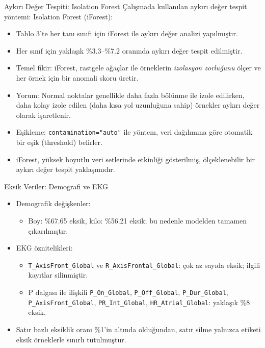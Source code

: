 \documentclass[aspectratio=169]{beamer}
\def\textbf#1{#1}%
\begin{document}
\begin{frame}{Aykırı Değer Tespiti: Isolation Forest}
	Çalışmada kullanılan aykırı değer tespit yöntemi: \textbf{Isolation Forest (iForest)}:
	\begin{itemize}
		\item \textbf{Tablo 3}’te her tanı sınıfı için iForest ile aykırı değer analizi yapılmıştır.
		\item Her sınıf için yaklaşık \textbf{\%3.3--\%7.2} oranında aykırı değer tespit edilmiştir.
		\item \textbf{Temel fikir:} iForest, rastgele ağaçlar ile örneklerin \emph{izolasyon zorluğunu} ölçer ve her örnek için bir \textbf{anomali skoru} üretir.
		\item \textbf{Yorum:} Normal noktalar genellikle daha fazla bölünme ile izole edilirken, \textbf{daha kolay izole edilen} (daha kısa yol uzunluğuna sahip) örnekler aykırı değer olarak işaretlenir.
		\item \textbf{Eşikleme:} \texttt{contamination="auto"} ile yöntem, veri dağılımına göre \textbf{otomatik} bir eşik (threshold) belirler.
		\item iForest, \textbf{yüksek boyutlu} veri setlerinde etkinliği gösterilmiş, ölçeklenebilir bir aykırı değer tespit yaklaşımıdır.
	\end{itemize}
\end{frame}

\begin{frame}{Eksik Veriler: Demografi ve EKG}
	\begin{itemize}
		\item Demografik değişkenler:
			\begin{itemize}
				\item Boy: \%67.65 eksik, kilo: \%56.21 eksik; bu nedenle modelden tamamen çıkarılmıştır.
			\end{itemize}
		\item EKG öznitelikleri:
			\begin{itemize}
				\item \texttt{T\_AxisFront\_Global} ve \texttt{R\_AxisFrontal\_Global}: çok az sayıda eksik; ilgili kayıtlar silinmiştir.
				\item P dalgası ile ilişkili \texttt{P\_On\_Global}, \texttt{P\_Off\_Global}, \texttt{P\_Dur\_Global}, \texttt{P\_AxisFront\_Global}, \texttt{PR\_Int\_Global}, \texttt{HR\_Atrial\_Global}: yaklaşık \%8 eksik.
			\end{itemize}
		\item Satır bazlı eksiklik oranı \%1'in altında olduğundan, satır silme yalnızca etiketi eksik örneklerle sınırlı tutulmuştur.
	\end{itemize}
\end{frame}
\end{document}
